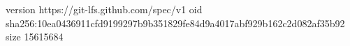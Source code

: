 version https://git-lfs.github.com/spec/v1
oid sha256:10ea0436911cfd9199297b9b351829fe84d9a4017abf929b162c2d082af35b92
size 15615684
